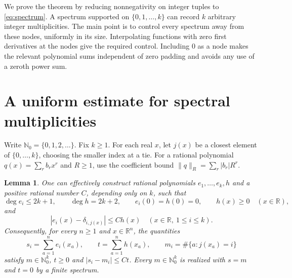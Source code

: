\documentclass[11pt]{article}
\newtheorem{lemma}[theorem]{Lemma}
\newcommand{\Nzero}{\mathbb{N}_0}
\begin{document}
We prove the theorem by reducing nonnegativity on integer tuples to
\eqref{eq:spectrum}. A spectrum supported on $\{0,1,\ldots,k\}$ can record
$k$ arbitrary integer multiplicities. The main point is to control every
spectrum away from these nodes, uniformly in its size. Interpolating functions
with zero first derivatives at the nodes give the required control. Including
$0$ as a node makes the relevant polynomial sums independent of zero padding
and avoids any use of a zeroth power sum.

\section{A uniform estimate for spectral multiplicities}

Write $\Nzero=\{0,1,2,\ldots\}$. Fix $k\geq1$. For each real $x$, let
$j(x)$ be a closest element of $\{0,\ldots,k\}$, choosing the smaller index at
a tie. For a rational polynomial $q(x)=\sum_r b_r x^r$ and $R\geq1$, use the
coefficient bound $\|q\|_R=\sum_r |b_r|R^r$.

\begin{lemma}\label{lem:rounding}
One can effectively construct rational polynomials $e_1,\ldots,e_k,h$ and a
positive rational number $C$, depending only on $k$, such that
\[
 \deg e_i\leq2k+1,\qquad \deg h=2k+2,\qquad
 e_i(0)=h(0)=0,\qquad h(x)\geq0\quad(x\in\mathbb{R}),
\]
and
\begin{equation}\label{eq:pointwise}
 |e_i(x)-\delta_{i,j(x)}|\leq C h(x)
 \quad (x\in\mathbb{R},\ 1\leq i\leq k).
\end{equation}
Consequently, for every $n\geq1$ and $x\in\mathbb{R}^n$, the quantities
\begin{equation}\label{eq:counts}
 s_i=\sum_{a=1}^n e_i(x_a),\qquad
 t=\sum_{a=1}^n h(x_a),\qquad
 m_i=\#\{a:j(x_a)=i\}
\end{equation}
satisfy $m\in\Nzero^k$, $t\geq0$ and $|s_i-m_i|\leq Ct$.
Every $m\in\Nzero^k$ is realized with $s=m$ and $t=0$ by a finite spectrum.
\end{lemma}
\end{document}
